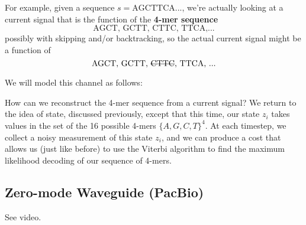 \documentclass{article}
\begin{document}
For example, given a sequence $s = \text{AGCTTCA...}$, we're actually looking at a current signal that is the function of
the \textbf{4-mer sequence} 
\[ \text{AGCT, GCTT, CTTC, TTCA,...}\]
possibly with skipping and/or backtracking, so the actual current signal might be a function of
\[ \text{AGCT, GCTT, \sout{CTTC}, TTCA, ...} \]

We will model this channel as follows:

\begin{figure}[H]
\centering
{}
\end{figure}

How can we reconstruct  the 4-mer sequence from a current signal? We return to the idea of state, discussed previously, except
that this time, our state $z_i$ takes values in the set of the 16 possible 4-mers $\{A, G, C, T\}^4$. At each timestep, we collect a noisy measurement of this
state $z_i$, and we can produce a cost that allows us (just like before) to use the Viterbi algorithm to find the maximum likelihood decoding of our sequence
of 4-mers.

\subsection*{Zero-mode Waveguide (PacBio)}
See video.
\end{document}

